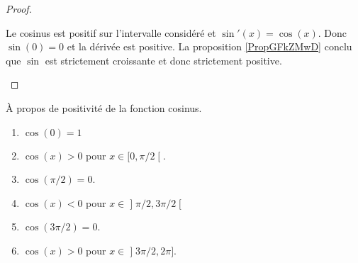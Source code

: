 \begin{proof}
\begin{enumerate}
		      Le cosinus est positif sur l'intervalle considéré et \( \sin'(x)=\cos(x)\). Donc \( \sin(0)=0\) et la dérivée est positive. La proposition \ref{PropGFkZMwD} conclu que \( \sin\) est strictement croissante et donc strictement positive.
	\end{enumerate}
\end{proof}

\begin{lemma}      \label{LEMooFESYooBoiuol}
	À propos de positivité de la fonction cosinus.
	\begin{enumerate}
		\item       \label{ITEMooIXSDooJyCQyb}
		      \( \cos(0)=1\)
		\item       \label{ITEMooWJEVooGZykbO}
		      \( \cos(x)>0\) pour \( x\in\mathopen[ 0 , \pi/2 \mathclose[\).
		\item       \label{ITEMooANEPooLGmYtc}
		      \( \cos(\pi/2)=0\).
		\item       \label{ITEMooRDWJooZXWyfv}
		      \( \cos(x)<0\) pour \( x\in \mathopen] \pi/2 , 3\pi/2 \mathclose[\)
		\item       \label{ITEMooFKPAooBNlvPU}
		      \( \cos(3\pi/2)=0\).
		\item       \label{ITEMooIDZGooBTDvDF}
		      \( \cos(x)>0\) pour \( x\in\mathopen] 3\pi/2 , 2\pi \mathclose]\).
	\end{enumerate}
\end{lemma}

